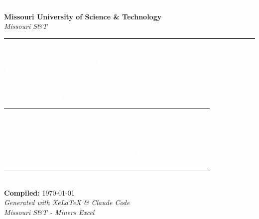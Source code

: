 \documentclass[12pt,oneside]{scrbook}
\begin{document}
\begin{titlepage}
\begin{center}
{\fontsize{24}{30}\selectfont\bfseries
\textcolor{white}{\textsf{Computer Science \& Engineering}}}\\[0.5cm]

{\fontsize{20}{24}\selectfont\bfseries
\textcolor{mstlimegreen}{\textsf{Missouri University of Science \& Technology}}}\\[0.3cm]
{\fontsize{16}{20}\selectfont
\textcolor{white!90}{\textit{Missouri S\&T}}}\\[1.5cm]

\textcolor{mstlimegreen}{\rule{12cm}{3pt}}\\[1cm]

{\fontsize{14}{18}\selectfont
\textcolor{white}{%
\textbf{Comprehensive Academic Journey}\\[0.4cm]
\textit{A curated collection of coursework, projects, and research\\
spanning foundations through advanced graduate studies}}}\\[1.5cm]

\colorbox{mstdarkgreen}{%
\begin{minipage}{11cm}
\centering
\vspace{0.5cm}
\textcolor{white}{%
{\large\bfseries\textcolor{mstlimegreen}{Course Coverage}}\\[0.6cm]
\begin{tabular}{ll}
\textcolor{mstlimegreen}{Computer Science:} & 8 Courses (CS 1200-5400) \\[0.2cm]
\textcolor{mstlimegreen}{Mathematics:} & 4 Courses (MATH 1214-2222) \\[0.2cm]
\textcolor{mstlimegreen}{Engineering Sciences:} & 6 Courses (CPE/PHYS) \\[0.2cm]
\textcolor{mstlimegreen}{Liberal Arts:} & 3 Courses (Ethics, Psychology, Statistics) \\[0.2cm]
\textcolor{mstlimegreen}{Teaching Materials:} & Instructional Documents
\end{tabular}
}
\vspace{0.5cm}
\end{minipage}
}\\[1.5cm]

{\fontsize{12}{15}\selectfont
\textcolor{mstlimegreen}{\textbf{Compiled:} \today}}\\[0.3cm]
{\fontsize{10}{12}\selectfont
\textcolor{white!80}{\textit{Generated with XeLaTeX \& Claude Code}}}\\[0.5cm]
{\fontsize{9}{11}\selectfont
\textcolor{white!70}{\textit{Missouri S\&T - Miners Excel}}}

\end{center}

\restoregeometry
\end{titlepage}
\end{document}
